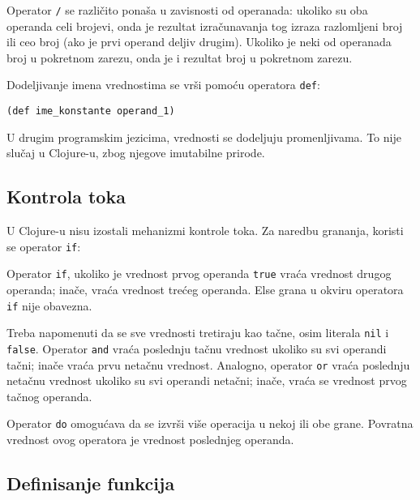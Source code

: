 

Operator \texttt{/} se različito ponaša u zavisnosti od operanada: ukoliko su oba operanda celi brojevi, onda je rezultat izračunavanja tog izraza razlomljeni broj ili ceo broj (ako je prvi operand deljiv drugim). Ukoliko je neki od operanada broj u pokretnom zarezu, onda je i rezultat broj u pokretnom zarezu.

Dodeljivanje imena vrednostima se vrši pomoću operatora \texttt{def}:

\begin{verbatim}
(def ime_konstante operand_1)
\end{verbatim}

U drugim programskim jezicima, vrednosti se dodeljuju promenljivama. To nije slučaj u Clojure-u, zbog njegove imutabilne prirode.

\subsection{Kontrola toka}
\label{subsec:kontrolatoka}

U Clojure-u nisu izostali mehanizmi kontrole toka. Za naredbu grananja, koristi se operator \texttt{if}:



Operator \texttt{if}, ukoliko je vrednost prvog operanda \texttt{true} vraća vrednost drugog operanda; inače, vraća vrednost trećeg operanda. Else grana u okviru operatora \texttt{if} nije obavezna.

Treba napomenuti da se sve vrednosti tretiraju kao tačne, osim literala \texttt{nil} i \texttt{false}. Operator \texttt{and} vraća poslednju tačnu vrednost ukoliko su svi operandi tačni; inače vraća prvu netačnu vrednost. Analogno, operator \texttt{or} vraća poslednju netačnu vrednost ukoliko su svi operandi netačni; inače, vraća se vrednost prvog tačnog operanda.

Operator \texttt{do} omogućava da se izvrši više operacija u nekoj ili obe grane. Povratna vrednost ovog operatora je vrednost poslednjeg operanda.

\subsection{Definisanje funkcija}
\label{subsec:definisanjefja}


